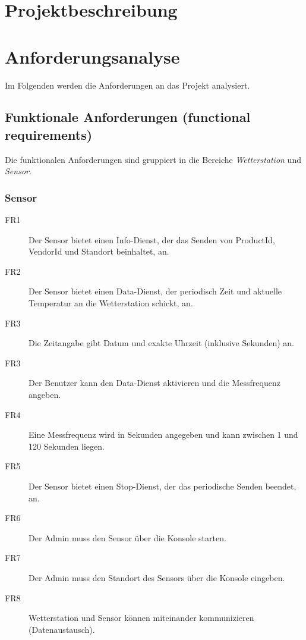 \documentclass[a4paper]{report}
\begin{document}
\chapter{Projektbeschreibung}
\chapter{Anforderungsanalyse}
Im Folgenden werden die Anforderungen an das Projekt analysiert.

\section{Funktionale Anforderungen (functional requirements)}
Die funktionalen Anforderungen sind gruppiert in die Bereiche \textit{Wetterstation} und \textit{Sensor}.
\subsection{Sensor}
\begin{description}
    \item[FR1] Der Sensor bietet einen Info-Dienst, der das Senden von ProductId, VendorId und Standort beinhaltet, an.
    \item[FR2] Der Sensor bietet einen Data-Dienst, der periodisch Zeit und aktuelle Temperatur an die Wetterstation schickt, an.
    \item[FR3] Die Zeitangabe gibt Datum und exakte Uhrzeit (inklusive Sekunden) an.
    \item[FR3] Der Benutzer kann den Data-Dienst aktivieren und die Messfrequenz angeben.
    \item[FR4] Eine Messfrequenz wird in Sekunden angegeben und kann zwischen 1 und 120 Sekunden liegen.  
    \item[FR5] Der Sensor bietet einen Stop-Dienst, der das periodische Senden beendet, an.
    \item[FR6] Der Admin muss den Sensor über die Konsole starten.
    \item[FR7] Der Admin muss den Standort des Sensors über die Konsole eingeben.  
    \item[FR8] Wetterstation und Sensor können miteinander kommunizieren (Datenaustausch).  
\end{description}
\end{document}
